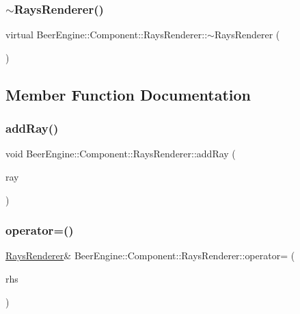 \subsubsection{\texorpdfstring{$\sim$\+Rays\+Renderer()}{~RaysRenderer()}}
{\footnotesize\ttfamily virtual Beer\+Engine\+::\+Component\+::\+Rays\+Renderer\+::$\sim$\+Rays\+Renderer (\begin{DoxyParamCaption}\item[{void}]{ }\end{DoxyParamCaption})\hspace{0.3cm}{\ttfamily [virtual]}}



\subsection{Member Function Documentation}
\mbox{\label{class_beer_engine_1_1_component_1_1_rays_renderer_a0597197520e656dde062527344d050e0}} 
\subsubsection{\texorpdfstring{add\+Ray()}{addRay()}}
{\footnotesize\ttfamily void Beer\+Engine\+::\+Component\+::\+Rays\+Renderer\+::add\+Ray (\begin{DoxyParamCaption}\item[{\mbox{\hyperlink{struct_beer_engine_1_1_physics_1_1_ray}{Physics\+::\+Ray}}}]{ray }\end{DoxyParamCaption})}

\mbox{\label{class_beer_engine_1_1_component_1_1_rays_renderer_af7fb2a4d060a59e907580d8689cf4256}} 
\subsubsection{\texorpdfstring{operator=()}{operator=()}}
{\footnotesize\ttfamily \mbox{\hyperlink{class_beer_engine_1_1_component_1_1_rays_renderer}{Rays\+Renderer}}\& Beer\+Engine\+::\+Component\+::\+Rays\+Renderer\+::operator= (\begin{DoxyParamCaption}\item[{\mbox{\hyperlink{class_beer_engine_1_1_component_1_1_rays_renderer}{Rays\+Renderer}} const \&}]{rhs }\end{DoxyParamCaption})}

